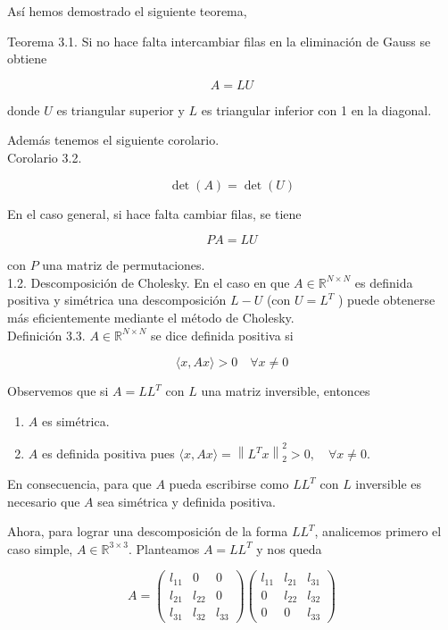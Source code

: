 \documentclass[10pt]{article}
\begin{document}
Así hemos demostrado el siguiente teorema,

Teorema 3.1. Si no hace falta intercambiar filas en la eliminación de Gauss se obtiene

$$
A=L U
$$

donde $U$ es triangular superior y $L$ es triangular inferior con 1 en la diagonal.

Además tenemos el siguiente corolario.\\
Corolario 3.2.

$$
\operatorname{det}(A)=\operatorname{det}(U)
$$

En el caso general, si hace falta cambiar filas, se tiene

$$
P A=L U
$$

con $P$ una matriz de permutaciones.\\
1.2. Descomposición de Cholesky. En el caso en que $A \in \mathbb{R}^{N \times N}$ es definida positiva y simétrica una descomposición $L-U$ (con $U=L^{T}$ ) puede obtenerse más eficientemente mediante el método de Cholesky.\\
Definición 3.3. $A \in \mathbb{R}^{N \times N}$ se dice definida positiva si

$$
\langle x, A x\rangle>0 \quad \forall x \neq 0
$$

Observemos que si $A=L L^{T}$ con $L$ una matriz inversible, entonces

\begin{enumerate}
  \item $A$ es simétrica.
  \item $A$ es definida positiva pues $\langle x, A x\rangle=\left\|L^{T} x\right\|_{2}^{2}>0, \quad \forall x \neq 0$.
\end{enumerate}

En consecuencia, para que $A$ pueda escribirse como $L L^{T}$ con $L$ inversible es necesario que $A$ sea simétrica y definida positiva.

Ahora, para lograr una descomposición de la forma $L L^{T}$, analicemos primero el caso simple, $A \in \mathbb{R}^{3 \times 3}$. Planteamos $A=L L^{T}$ y nos queda

$$
A=\left(\begin{array}{ccc}
l_{11} & 0 & 0 \\
l_{21} & l_{22} & 0 \\
l_{31} & l_{32} & l_{33}
\end{array}\right)\left(\begin{array}{ccc}
l_{11} & l_{21} & l_{31} \\
0 & l_{22} & l_{32} \\
0 & 0 & l_{33}
\end{array}\right)
$$
\end{document}
